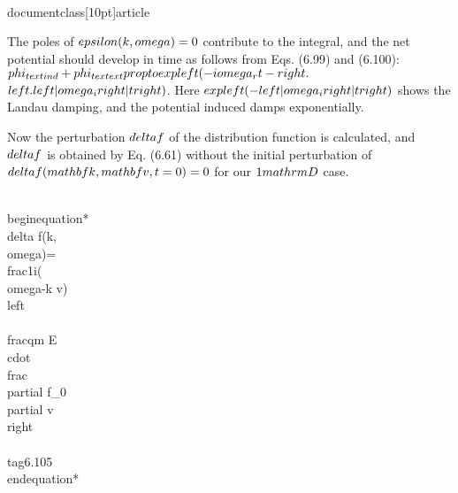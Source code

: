 \\documentclass[10pt]{article}
\begin{document}
{{{{The poles of $\\epsilon(k, \\omega)=0$ contribute to the integral, and the net potential should develop in time as follows from Eqs. (6.99) and (6.100): $\\phi_{\\text {ind }}+\\phi_{\\text {ext }} \\propto \\exp \\left(-i \\omega_{r} t-\\right.$ $\\left.\\left|\\omega_{i}\\right| t\\right)$. Here $\\exp \\left(-\\left|\\omega_{i}\\right| t\\right)$ shows the Landau damping, and the potential induced damps exponentially.

Now the perturbation $\\delta f$ of the distribution function is calculated, and $\\delta f$ is obtained by Eq. (6.61) without the initial perturbation of $\\delta f(\\mathbf{k}, \\mathbf{v}, t=0)=0$ for our $1 \\mathrm{D}$ case.


\\begin{equation*}
\\delta f(k, \\omega)=\\frac{1}{i(\\omega-k v)}\\left\\{\\frac{q}{m} E \\cdot \\frac{\\partial f_{0}}{\\partial v}\\right\\} \\tag{6.105}
\\end{equation*}


}}}}
\end{document}
